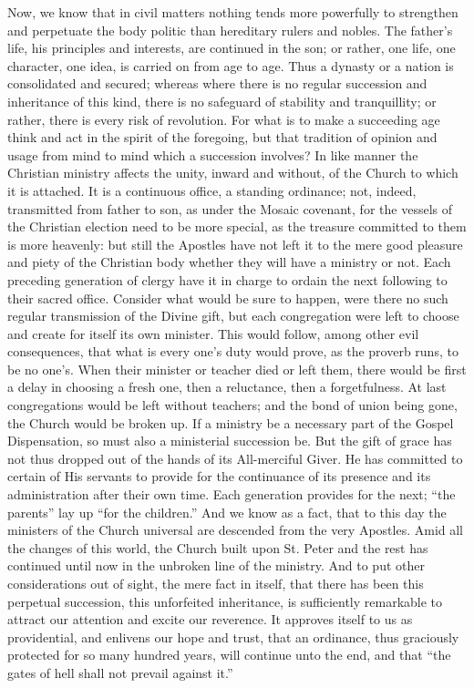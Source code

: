 Now, we know that in civil matters nothing tends more powerfully to
strengthen and perpetuate the body politic than hereditary rulers and
nobles. The father's life, his principles and interests, are continued
in the son; or rather, one life, one character, one idea, is carried
on from age to age. Thus a dynasty or a nation is consolidated and
secured; whereas where there is no regular succession and inheritance
of this kind, there is no safeguard of stability and tranquillity; or
rather, there is every risk of revolution. For what is to make a
succeeding age think and act in the spirit of the foregoing, but that
tradition of opinion and usage from mind to mind which a succession
involves? In like manner the Christian ministry affects the unity,
inward and without, of the Church to which it is attached. It is a
continuous office, a standing ordinance; not, indeed, transmitted from
father to son, as under the Mosaic covenant, for the vessels of the
Christian election need to be more special, as the treasure committed
to them is more heavenly: but still the Apostles have not left it to
the mere good pleasure and piety of the Christian body whether they
will have a ministry or not. Each preceding generation of clergy have
it in charge to ordain the next following to their sacred office.
Consider what would be sure to happen, were there no such regular
transmission of the Divine gift, but each congregation were left to
choose and create for itself its own minister. This would follow,
among other evil consequences, that what is every one's duty would
prove, as the proverb runs, to be no one's. When their minister or
teacher died or left them, there would be first a delay in choosing a
fresh one, then a reluctance, then a forgetfulness. At last
congregations would be left without teachers; and the bond of union
being gone, the Church would be broken up. If a ministry be a
necessary part of the Gospel Dispensation, so must also a ministerial
succession be. But the gift of grace has not thus dropped out of the
hands of its All-merciful Giver. He has committed to certain of His
servants to provide for the continuance of its presence and its
administration after their own time. Each generation provides for the
next; ``the parents'' lay up ``for the children.'' And
we know as a fact, that to this day the ministers of the Church
universal are descended from the very Apostles. Amid all the changes
of this world, the Church built upon St. Peter and the rest has
continued until now in the unbroken line of the ministry. And to put
other considerations out of sight, the mere fact in itself, that there
has been this perpetual succession, this unforfeited inheritance, is
sufficiently remarkable to attract our attention and excite our
reverence. It approves itself to us as providential, and enlivens our
hope and trust, that an ordinance, thus graciously protected for so
many hundred years, will continue unto the end, and that ``the
gates of hell shall not prevail against it.''

